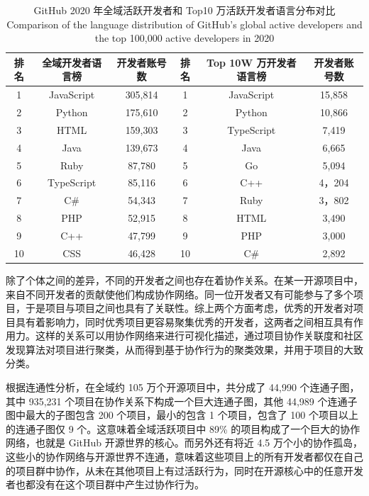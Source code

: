 \begin{table}[htbp]\center
    \begin{tabular}{|c|cc|c|cc}
        \hline
        排名 & 全域开发者语言榜 & 开发者账号数 & 排名 & Top 10W 万开发者语言榜 & 开发者账号数\\
        \hline
        1 & JavaScript & 305,814 & 1 & JavaScript & 15,858 \\
        2 & Python & 175,610 & 2 & Python & 10,866 \\
        3 & HTML & 159,303 & 3 & TypeScript & 7,419 \\
        4 & Java & 139,673 & 4 & Java & 6,665 \\
        5 & Ruby & 87,780 & 5 & Go & 5,094 \\
        6 & TypeScript & 85,116 & 6 & C++ & 4，204 \\
        7 & C\# & 54,343 & 7 & Ruby & 3，802 \\
        8 & PHP & 52,915 & 8 & HTML & 3,490 \\
        9 & C++ & 47,799 & 9 & PHP & 3,000 \\
        10 & CSS & 46,428 & 10 & C\# & 2,892 \\
        \hline
    \end{tabular}
    \caption{GitHub 2020 年全域活跃开发者和 Top10 万活跃开发者语言分布对比\\ Comparison of the language distribution of GitHub's global active developers and the top 100,000 active developers in 2020}
\end{table}

\par 除了个体之间的差异，不同的开发者之间也存在着协作关系。在某一开源项目中，来自不同开发者的贡献使他们构成协作网络。同一位开发者又有可能参与了多个项目，于是项目与项目之间也具有了关联性。综上两个方面考虑，优秀的开发者对项目具有着影响力，同时优秀项目更容易聚集优秀的开发者，这两者之间相互具有作用力。这样的关系可以用协作网络来进行可视化描述，通过项目协作关联度和社区发现算法对项目进行聚类，从而得到基于协作行为的聚类效果，并用于项目的大致分类。

\par 根据连通性分析，在全域约 105 万个开源项目中，共分成了 44,990 个连通子图，其中 935,231 个项目在协作关系下构成一个巨大连通子图，其他 44,989 个连通子图中最大的子图包含 200 个项目，最小的包含 1 个项目，包含了 100 个项目以上的连通子图仅 9 个。这意味着全域活跃项目中 89\% 的项目构成了一个巨大的协作网络，也就是 GitHub 开源世界的核心。而另外还有将近 4.5 万个小的协作孤岛，这些小的协作网络与开源世界不连通，意味着这些项目上的所有开发者都仅在自己的项目群中协作，从未在其他项目上有过活跃行为，同时在开源核心中的任意开发者也都没有在这个项目群中产生过协作行为。


